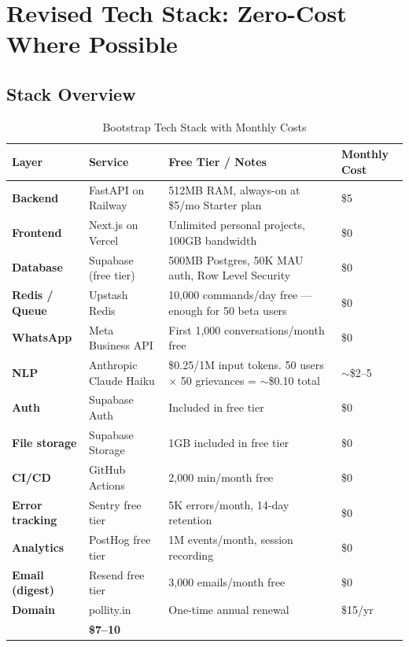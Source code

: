\documentclass[12pt, a4paper]{article}
\begin{document}
\newpage

\section{Revised Tech Stack: Zero-Cost Where Possible}

\subsection{Stack Overview}

\begin{table}[ht]
\centering
\caption{Bootstrap Tech Stack with Monthly Costs}
\renewcommand{\arraystretch}{1.5}
\begin{tabularx}{\textwidth}{>{\bfseries}p{2.5cm} p{3.5cm} X p{1.8cm}}
\toprule
\rowcolor{pollitylightblue}
\textbf{Layer} & \textbf{Service} & \textbf{Free Tier / Notes} & \textbf{Monthly Cost} \\
\midrule
Backend        & FastAPI on Railway      & 512MB RAM, always-on at \$5/mo Starter plan & \$5 \\
Frontend       & Next.js on Vercel       & Unlimited personal projects, 100GB bandwidth & \$0 \\
Database       & Supabase (free tier)    & 500MB Postgres, 50K MAU auth, Row Level Security & \$0 \\
Redis / Queue  & Upstash Redis           & 10,000 commands/day free --- enough for 50 beta users & \$0 \\
WhatsApp       & Meta Business API       & First 1,000 conversations/month free & \$0 \\
NLP            & Anthropic Claude Haiku  & \$0.25/1M input tokens. 50 users $\times$ 50 grievances = $\sim$\$0.10 total & $\sim$\$2--5 \\
Auth           & Supabase Auth           & Included in free tier & \$0 \\
File storage   & Supabase Storage        & 1GB included in free tier & \$0 \\
CI/CD          & GitHub Actions          & 2,000 min/month free & \$0 \\
Error tracking & Sentry free tier        & 5K errors/month, 14-day retention & \$0 \\
Analytics      & PostHog free tier       & 1M events/month, session recording & \$0 \\
Email (digest) & Resend free tier        & 3,000 emails/month free & \$0 \\
Domain         & pollity.in              & One-time annual renewal & \$15/yr \\
\midrule
\rowcolor{lightgreen}
\multicolumn{3}{l}{\textbf{Total monthly infrastructure cost}} & \textbf{\$7--10} \\
\bottomrule
\end{tabularx}
\end{table}
\end{document}
